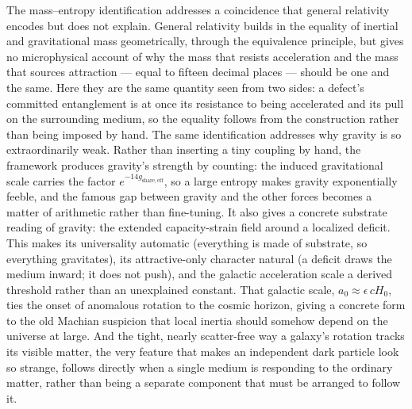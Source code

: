 \documentclass[11pt]{article}
\begin{document}
The mass--entropy identification addresses a coincidence that general relativity encodes but does not explain. General relativity builds in the equality of inertial and gravitational mass geometrically, through the equivalence principle, but gives no microphysical account of why the mass that resists acceleration and the mass that sources attraction --- equal to fifteen decimal places --- should be one and the same. Here they are the same quantity seen from two sides: a defect's committed entanglement is at once its resistance to being accelerated and its pull on the surrounding medium, so the equality follows from the construction rather than being imposed by hand. The same identification addresses why gravity is so extraordinarily weak. Rather than inserting a tiny coupling by hand, the framework produces gravity's strength by counting: the induced gravitational scale carries the factor $e^{-14g_{\mathrm{share,eff}}}$, so a large entropy makes gravity exponentially feeble, and the famous gap between gravity and the other forces becomes a matter of arithmetic rather than fine-tuning. It also gives a concrete substrate reading of gravity: the extended capacity-strain field around a localized deficit. This makes its universality automatic (everything is made of substrate, so everything gravitates), its attractive-only character natural (a deficit draws the medium inward; it does not push), and the galactic acceleration scale a derived threshold rather than an unexplained constant. That galactic scale, $a_0\approx \epsilon\,cH_0$, ties the onset of anomalous rotation to the cosmic horizon, giving a concrete form to the old Machian suspicion that local inertia should somehow depend on the universe at large. And the tight, nearly scatter-free way a galaxy's rotation tracks its visible matter, the very feature that makes an independent dark particle look so strange, follows directly when a single medium is responding to the ordinary matter, rather than being a separate component that must be arranged to follow it.
\end{document}
